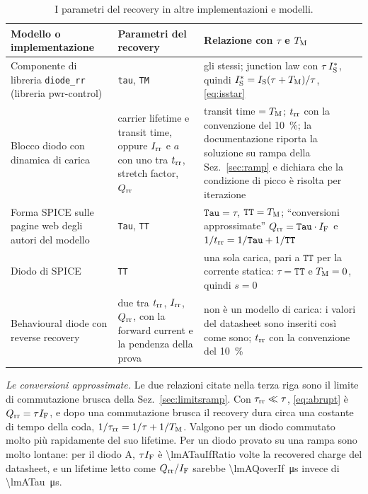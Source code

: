 \documentclass[10pt,a4paper]{scrartcl}
\let\newcommand\lmitdefine
\newcommand{\IF}{I_\mathrm{F}}
\newcommand{\Irr}{I_\mathrm{rr}}
\newcommand{\Qrr}{Q_\mathrm{rr}}
\newcommand{\trr}{t_\mathrm{rr}}
\newcommand{\taurr}{\tau_\mathrm{rr}}
\newcommand{\TM}{T_\mathrm{M}}
\newcommand{\IS}{I_\mathrm{S}}
\begin{document}
\begin{table}[htb]
\centering\small
\caption{I parametri del recovery in altre implementazioni e modelli.}
\label{tab:others}
\begin{tabular}{@{}p{4.6cm}p{4.2cm}p{7.2cm}@{}}
\toprule
Modello o implementazione & Parametri del recovery & Relazione con $\tau$ e $\TM$ \\
\midrule
Componente di libreria \texttt{diode\_rr} (libreria pwr-control) & \texttt{tau}, \texttt{TM} & gli stessi; junction law con $\tau\,\IS^{*}$, quindi $\IS^{*} = \IS(\tau+\TM)/\tau$, \eqref{eq:isstar} \\
\addlinespace
Blocco diodo con dinamica di carica \cite{mathworks} & carrier lifetime e transit time, oppure $\Irr$ e $a$ con uno tra $\trr$, stretch factor, $\Qrr$ & transit time $= \TM$; $\trr$ con la convenzione del \SI{10}{\percent}; la documentazione riporta la soluzione su rampa della Sez.~\ref{sec:ramp} e dichiara che la condizione di picco è risolta per iterazione \\
\addlinespace
Forma SPICE sulle pagine web degli autori del modello \cite{pemodels} & \texttt{Tau}, \texttt{TT} & $\texttt{Tau} = \tau$, $\texttt{TT} = \TM$; ``conversioni approssimate'' $\Qrr = \texttt{Tau}\cdot\IF$ e $1/\trr = 1/\texttt{Tau} + 1/\texttt{TT}$ \\
\addlinespace
Diodo di SPICE & \texttt{TT} & una sola carica, pari a $\texttt{TT}$ per la corrente statica: $\tau = \texttt{TT}$ e $\TM = 0$, quindi $s = 0$ \\
\addlinespace
Behavioural diode con reverse recovery \cite{plecs} & due tra $\trr$, $\Irr$, $\Qrr$, con la forward current e la pendenza della prova & non è un modello di carica: i valori del datasheet sono inseriti così come sono; $\trr$ con la convenzione del \SI{10}{\percent} \\
\bottomrule
\end{tabular}
\end{table}

\emph{Le conversioni approssimate.} Le due relazioni citate nella terza riga sono il limite di commutazione brusca della Sez.~\ref{sec:limitsramp}. Con $\taurr \ll \tau$, \eqref{eq:abrupt} è $\Qrr = \tau\IF$, e dopo una commutazione brusca il recovery dura circa una costante di tempo della coda, $1/\taurr = 1/\tau + 1/\TM$. Valgono per un diodo commutato molto più rapidamente del suo lifetime. Per un diodo provato su una rampa sono molto lontane: per il diodo A, $\tau\IF$ è \num{\lmATauIfRatio} volte la recovered charge del datasheet, e un lifetime letto come $\Qrr/\IF$ sarebbe \SI{\lmAQoverIf}{\micro\second} invece di \SI{\lmATau}{\micro\second}.
\end{document}
